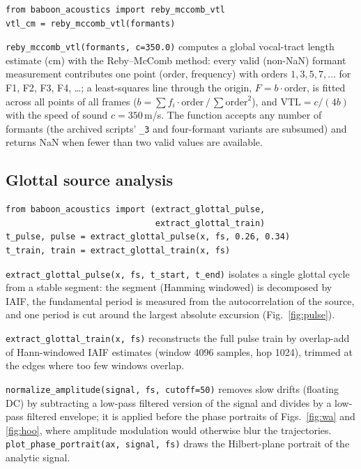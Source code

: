 \documentclass[11pt,a4paper]{article}
\newcommand{\file}[1]{\texttt{#1}}
\begin{document}
\begin{lstlisting}
from baboon_acoustics import reby_mccomb_vtl
vtl_cm = reby_mccomb_vtl(formants)
\end{lstlisting}
\file{reby\_mccomb\_vtl(formants, c=350.0)} computes a global
vocal-tract length estimate (cm) with the Reby--McComb method: every
valid (non-NaN) formant measurement contributes one point
(order, frequency) with orders $1, 3, 5, 7, \ldots$ for F1, F2, F3,
F4, \ldots; a least-squares line through the origin,
$F = b \cdot \mathrm{order}$, is fitted across all points of all frames
($b = \sum f_i \cdot \mathrm{order} \,/\, \sum \mathrm{order}^2$), and
$\mathrm{VTL} = c/(4b)$ with the speed of sound $c = 350$\,m/s. The
function accepts any number of formants (the archived scripts'
\file{\_3} and four-formant variants are subsumed) and returns NaN when
fewer than two valid values are available.

\subsection{Glottal source analysis}

\begin{lstlisting}
from baboon_acoustics import (extract_glottal_pulse,
                              extract_glottal_train)
t_pulse, pulse = extract_glottal_pulse(x, fs, 0.26, 0.34)
t_train, train = extract_glottal_train(x, fs)
\end{lstlisting}
\file{extract\_glottal\_pulse(x, fs, t\_start, t\_end)} isolates a
single glottal cycle from a stable segment: the segment (Hamming
windowed) is decomposed by IAIF, the fundamental period is measured from
the autocorrelation of the source, and one period is cut around the
largest absolute excursion (Fig.~\ref{fig:pulse}).

\file{extract\_glottal\_train(x, fs)} reconstructs the full pulse train
by overlap-add of Hann-windowed IAIF estimates (window 4096 samples, hop
1024), trimmed at the edges where too few windows overlap.

\file{normalize\_amplitude(signal, fs, cutoff=50)} removes slow drifts
(floating DC) by subtracting a low-pass filtered version of the signal
and divides by a low-pass filtered envelope; it is applied before the
phase portraits of Figs.~\ref{fig:wa} and \ref{fig:hoo}, where amplitude
modulation would otherwise blur the trajectories.
\file{plot\_phase\_portrait(ax, signal, fs)} draws the Hilbert-plane
portrait of the analytic signal.

\end{document}
